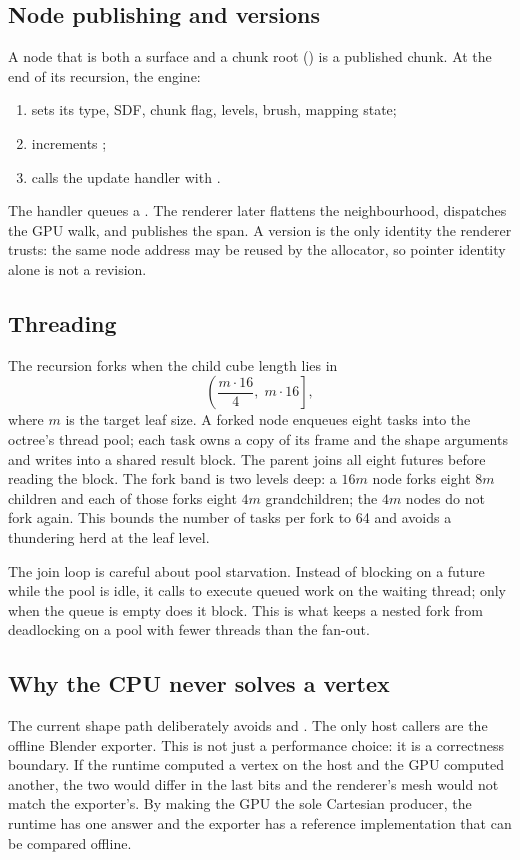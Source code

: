 \subsection{Node publishing and versions}

A node that is both a surface and a chunk root () is a
published chunk.  At the end of its recursion, the engine:
\begin{enumerate}
\item sets its type, SDF, chunk flag, levels, brush, mapping state;
\item increments ;
\item calls the update handler with .
\end{enumerate}
The handler queues a .  The renderer later flattens
the neighbourhood, dispatches the GPU walk, and publishes the span.  A
version is the only identity the renderer trusts: the same node address may
be reused by the allocator, so pointer identity alone is not a revision.

\subsection{Threading}

The recursion forks when the child cube length lies in
\begin{equation}
  \left(\frac{m\cdot 16}{4},\;m\cdot 16\right],
\end{equation}
where $m$ is the target leaf size.  A forked node enqueues eight tasks into
the octree's thread pool; each task owns a copy of its frame and the shape
arguments and writes into a shared result block.  The parent joins all
eight futures before reading the block.  The fork band is two levels deep:
a $16m$ node forks eight $8m$ children and each of those forks eight $4m$
grandchildren; the $4m$ nodes do not fork again.  This bounds the number of
tasks per fork to 64 and avoids a thundering herd at the leaf level.

The join loop is careful about pool starvation.  Instead of blocking on a
future while the pool is idle, it calls  to execute
queued work on the waiting thread; only when the queue is empty does it
block.  This is what keeps a nested fork from deadlocking on a pool with
fewer threads than the fan-out.

\subsection{Why the CPU never solves a vertex}

The current shape path deliberately avoids  and
.  The only host callers are the offline
Blender exporter.  This is not just a performance choice: it is a
correctness boundary.  If the runtime computed a vertex on the host and the
GPU computed another, the two would differ in the last bits and the
renderer's mesh would not match the exporter's.  By making the GPU the sole
Cartesian producer, the runtime has one answer and the exporter has a
reference implementation that can be compared offline.
